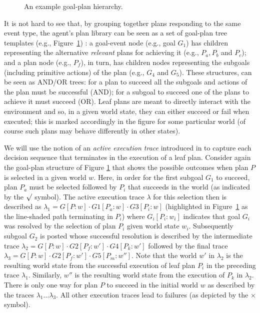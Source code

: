 \begin{figure}[t]
\begin{center}

\end{center}
\caption{An example goal-plan hierarchy.}
\label{fig:confidence}
\end{figure}

It is not hard to see that, by grouping together plans responding to the same event type, the agent's plan library can be seen as
a set of goal-plan tree templates (e.g., Figure~\ref{fig:confidence}) \cite{ShawBordini:AAMAS08}: a goal-event node (e.g., goal $G_1$) has children representing the alternative \emph{relevant} plans for achieving it (e.g., $P_a,P_b$ and $P_c$); and a plan node (e.g., $P_f$), in turn, has children nodes representing the subgoals (including primitive actions) of the plan (e.g., $G_4$ and $G_5$). These structures, can be seen as AND/OR trees: for a plan to succeed all the subgoals and actions of the plan must be successful (AND); for a subgoal to succeed one of the plans to achieve it must succeed (OR). Leaf plans are meant to directly interact with the environment and so, in a given world state, they can either succeed or fail when executed; this is marked accordingly in the figure for some particular world (of course such plans may behave differently in other states).

We will use the notion of an {\em active execution trace} introduced in \cite{singh10:learning} to capture each decision sequence that terminates in the execution of a leaf plan. Consider again the goal-plan structure of Figure \ref{fig:confidence} that shows the possible outcomes when plan $P$ is selected in a given world $w$. Here, in order for the first subgoal $G_1$ to succeed, plan $P_a$ must be selected followed by $P_i$ that succeeds in the world (as indicated by the $\surd$ symbol). The active execution trace $\lambda$ for this selection then is described as $\lambda_1=G[P:w] \cdot G1[P_a:w] \cdot G3[P_i:w]$ (highlighted in Figure~\ref{fig:confidence} as the line-shaded path terminating in $P_i$) where $G_i[P_i:w_i]$ indicates that goal $G_i$ was resolved by the selection of plan $P_i$ given world state $w_i$. Subsequently subgoal $G_2$ is posted whose successful resolution is described by the intermediate trace $\lambda_2=G[P:w] \cdot G2[P_f:w'] \cdot G4[P_k:w']$ followed by the final trace $\lambda_3=G[P:w] \cdot G2[P_f:w'] \cdot G5[P_m:w'']$. Note that the world $w'$ in $\lambda_2$ is the resulting world state from the successful execution of leaf plan $P_i$ in the preceding trace $\lambda_1$. Similarly, $w''$ is the resulting world state from the execution of $P_k$ in $\lambda_2$. There is only one way for plan $P$ to succeed in the initial world $w$ as described by the traces $\lambda_1 \ldots \lambda_3$. All other execution traces lead to failures (as depicted by the $\times$ symbol).

